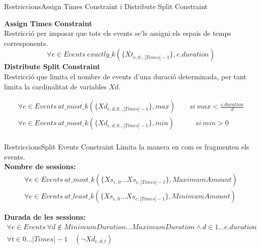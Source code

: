 \documentclass[13pt]{beamer}
\begin{document}
  
  \begin{frame}{Restriccions}{Assign Times Constraint i Distribute Split Constraint}

    \textbf{Assign Times Constraint}\\
    Restricció per imposar que tots els events se'ls assigni els espais de temps corresponents. 
    \[
      \forall e \in Events \ exactly\_k(\{Xt_{e,0 ... |Times|-1}\}, e.duration)
    \]
    \textbf{Distribute Split Constraint}\\
    Restricció que limita el nombre de events d'una duració determinada, per tant limita la cardinalitat de variables $Xd$.

      \begin{align*}
      \forall e \in Events \ at\_most\_k(\{Xd_{e,d,0 ... |Times|-1}\}, max) \quad \quad si \ max<\frac{e.duration}{d}\\
      \forall e \in Events \ at\_most\_k(\{Xd_{e,d,0 ... |Times|-1}\}, min) \quad \quad \quad si \ min>0\\
      \end{align*}

  \end{frame}

  \begin{frame}{Restriccions}{Split Events Constraint}
    Limita la manera en com es fragmenten els events.
    \\\textbf{Nombre de sessions:}
    \begin{gather*}
      \forall e \in Events \ at\_most\_k(\{Xs_{e,0} . . . Xs_{e,|Times|-1}\}, MaximumAmount)\\
      \forall e \in Events \ at\_least\_k(\{Xs_{e,0} . . . Xs_{e,|Times|-1}\}, MinimumAmount)
    \end{gather*}
  
    \textbf{Durada de les sessions:}
    \begin{gather*}
      \forall e \in Events \ \forall d \notin MinimumDuration...MaximumDuration \land d \in 1 ... e.duration  \\
      \forall t \in 0...|Times|-1 \quad (\neg Xd_{e,d,t})
    \end{gather*}  
  \end{frame}
\end{document}
